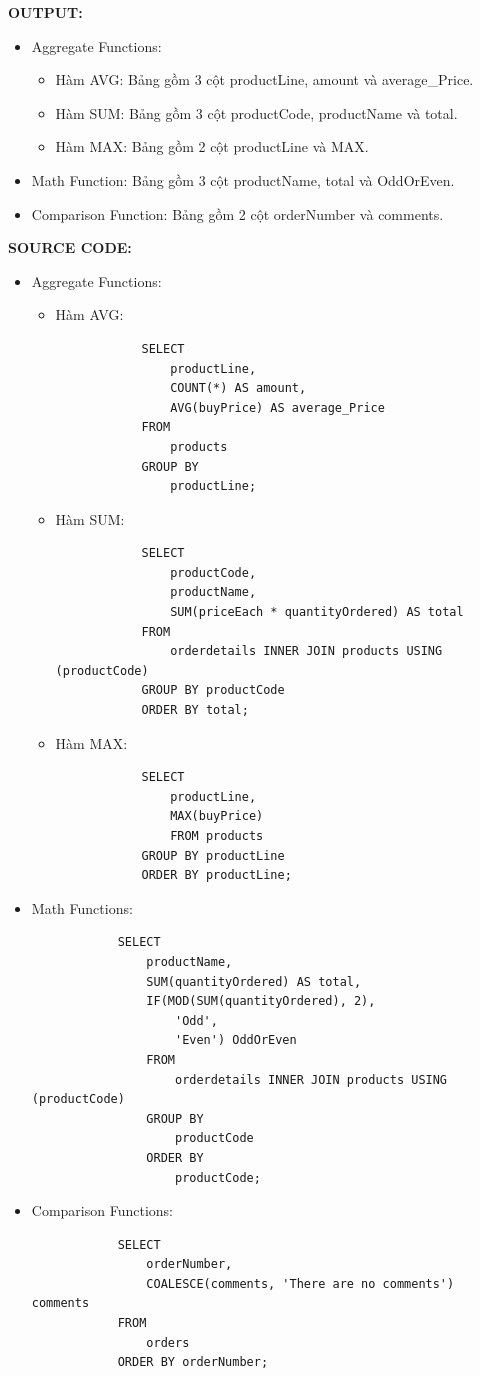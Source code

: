 \documentclass[12pt,a4paper]{report}
\begin{document}
	{\bf OUTPUT:}
	\begin{itemize}
		\item Aggregate Functions:
		\begin{itemize}
			\item Hàm AVG: Bảng gồm 3 cột productLine, amount và average\_Price.
			\item Hàm SUM: Bảng gồm 3 cột productCode, productName và total.
			\item Hàm MAX: Bảng gồm 2 cột productLine và MAX.
		\end{itemize}
		\item Math Function: Bảng gồm 3 cột productName, total và OddOrEven.
		\item Comparison Function: Bảng gồm 2 cột orderNumber và comments.
	\end{itemize}
	
	{\bf SOURCE CODE:}
	\begin{itemize}
	\item Aggregate Functions:
	\begin{itemize}
		\item Hàm AVG:
		\begin{lstlisting}
			SELECT 
				productLine,
    			COUNT(*) AS amount,
    			AVG(buyPrice) AS average_Price
			FROM 
				products
			GROUP BY
				productLine;
    	\end{lstlisting}
    	\item Hàm SUM:
    	\begin{lstlisting}
			SELECT
				productCode,
    			productName,
    			SUM(priceEach * quantityOrdered) AS total
			FROM 
				orderdetails INNER JOIN products USING (productCode)
			GROUP BY productCode
			ORDER BY total;
		\end{lstlisting}
		\item Hàm MAX:
		\begin{lstlisting}
			SELECT
				productLine,
    			MAX(buyPrice)
				FROM products
			GROUP BY productLine
			ORDER BY productLine;
		\end{lstlisting}	
	\end{itemize}
	\item Math Functions:
		\begin{lstlisting}
			SELECT 
    			productName,
    			SUM(quantityOrdered) AS total,
    			IF(MOD(SUM(quantityOrdered), 2),
					'Odd',
        			'Even') OddOrEven
				FROM 
					orderdetails INNER JOIN products USING (productCode)
				GROUP BY 
					productCode
				ORDER BY
					productCode;
		\end{lstlisting}
	
	\item Comparison Functions:
		\begin{lstlisting}
			SELECT
				orderNumber,
    			COALESCE(comments, 'There are no comments') comments
			FROM 
				orders
			ORDER BY orderNumber;
		\end{lstlisting}
	\end{itemize}
	
\end{document}
